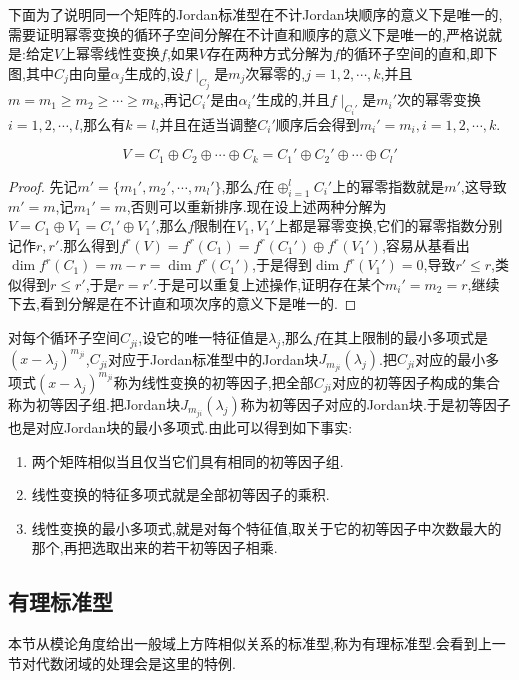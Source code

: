 下面为了说明同一个矩阵的Jordan标准型在不计Jordan块顺序的意义下是唯一的,需要证明幂零变换的循环子空间分解在不计直和顺序的意义下是唯一的,严格说就是:给定$V$上幂零线性变换$f$,如果$V$存在两种方式分解为$f$的循环子空间的直和,即下图,其中$C_j$由向量$\alpha_j$生成的,设$f\mid_{C_j}$是$m_j$次幂零的,$j=1,2,\cdots,k$,并且$m=m_1\ge m_2\ge\cdots\ge m_k$,再记$C_i'$是由$\alpha_i'$生成的,并且$f\mid_{C_i'}$是$m_i'$次的幂零变换$i=1,2,\cdots,l$,那么有$k=l$,并且在适当调整$C_i'$顺序后会得到$m_i'=m_i,i=1,2,\cdots,k$.

$$V=C_1\oplus C_2\oplus\cdots\oplus C_k=C_1'\oplus C_2'\oplus\cdots\oplus C_l'$$

\begin{proof}
	
	先记$m'=\{m_1',m_2',\cdots,m_l'\}$,那么$f$在$\oplus_{i=1}^lC_i'$上的幂零指数就是$m'$,这导致$m'=m$,记$m_1'=m$,否则可以重新排序.现在设上述两种分解为$V=C_1\oplus V_1=C_1'\oplus V_1'$,那么$f$限制在$V_1,V_1'$上都是幂零变换,它们的幂零指数分别记作$r,r'$.那么得到$f^r(V)=f^r(C_1)=f^r(C_1')\oplus f^r(V_1')$,容易从基看出$\dim f^r(C_1)=m-r=\dim f^r(C_1')$,于是得到$\dim f^r(V_1')=0$,导致$r'\le r$,类似得到$r\le r'$,于是$r=r'$.于是可以重复上述操作,证明存在某个$m_i'=m_2=r$,继续下去,看到分解是在不计直和项次序的意义下是唯一的.
	
\end{proof}

对每个循环子空间$C_{ji}$,设它的唯一特征值是$\lambda_j$,那么$f$在其上限制的最小多项式是$(x-\lambda_j)^{m_{ji}}$,$C_{ji}$对应于Jordan标准型中的Jordan块$J_{m_{ji}}(\lambda_j)$.把$C_{ji}$对应的最小多项式$(x-\lambda_j)^{m_{ji}}$称为线性变换的初等因子,把全部$C_{ji}$对应的初等因子构成的集合称为初等因子组.把Jordan块$J_{m_{ji}}(\lambda_j)$称为初等因子对应的Jordan块.于是初等因子也是对应Jordan块的最小多项式.由此可以得到如下事实:
\begin{enumerate}
	\item 两个矩阵相似当且仅当它们具有相同的初等因子组.
	\item 线性变换的特征多项式就是全部初等因子的乘积.
	\item 线性变换的最小多项式,就是对每个特征值,取关于它的初等因子中次数最大的那个,再把选取出来的若干初等因子相乘.
\end{enumerate}
\newpage
\subsection{有理标准型}

本节从模论角度给出一般域上方阵相似关系的标准型,称为有理标准型.会看到上一节对代数闭域的处理会是这里的特例.

